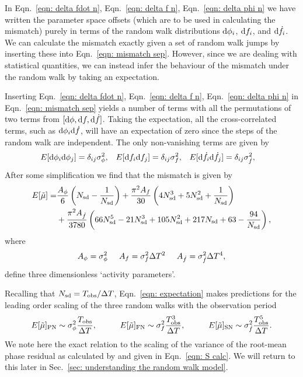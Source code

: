 \documentclass[../full_thesis/full_thesis.tex]{subfiles}
\begin{document}
In Eqn.~\eqref{eqn: delta fdot n}, Eqn.~\eqref{eqn: delta f n},
Eqn.~\eqref{eqn: delta phi n} we have written the parameter space offsets
(which are to be used in calculating the mismatch) purely in terms of the
random walk distributions $\mathrm{d} \phi_i$, $\mathrm{d} f_i$, and $\mathrm{d} \dot{f}_i$. We can
calculate the mismatch exactly given a set of random walk jumps by inserting
these into Eqn.~\eqref{eqn: mismatch sep}. However, since we are dealing with
statistical quantities, we can instead infer the behaviour of the mismatch
under the random walk by taking an expectation.

Inserting Eqn.~\eqref{eqn: delta fdot n}, Eqn.~\eqref{eqn: delta f n},
Eqn.~\eqref{eqn: delta phi n}  in Eqn.~\eqref{eqn: mismatch sep} yields a
number of terms with all the permutations of two terms from $[\mathrm{d} \phi, \mathrm{d} f,
\mathrm{d} \dot{f}]$. Taking the expectation, all the cross-correlated terms, such as
$\mathrm{d}\phi_{i}\mathrm{d} \dot{f}$, will have an expectation of zero since the steps of the
random walk are independent. The only non-vanishing terms are given by
\begin{align}
E[\mathrm{d}\phi_{i}\mathrm{d}\phi_{j}] &= \delta_{ij}\sigma_{\phi}^{2}, &
E[\mathrm{d}f_{i}\mathrm{d}f_{j}] &= \delta_{ij}\sigma_{f}^{2},&
E[\mathrm{d}\dot{f}_{i}\mathrm{d}\dot{f}_{j}] &= \delta_{ij}\sigma_{\dot{f}}^{2},
\end{align}
After some simplification we find that the mismatch is given by
\begin{align}
\begin{split}
E[\tilde{\mu}]   = &  \frac{A_{\phi}}{6} \left(N_{\textrm{sd}} - \frac{1}{N_{\textrm{sd}}}\right)
+ \frac{\pi^{2} A_{{f}}}{30}\left(4 N_{\textrm{sd}}^{3} + 5 N_{\textrm{sd}}^{2} + \frac{1}{N_{\textrm{sd}}}\right)\\
 & +  \frac{\pi^{2} A_{{\dot{f}}}}{3780} \left(66 N_{\textrm{sd}}^{5} - 21 N_{\textrm{sd}}^{3} + 105 N_{\textrm{sd}}^{2}
 + 217 N_{\textrm{sd}} + 63 - \frac{94}{N_{\textrm{sd}}}\right),
\end{split}
\label{eqn: expectation}
\end{align}
where
\begin{equation}
	A_{\phi} = \sigma_{\phi}^{2} \;\;\;\;\;
    A_{f} = \sigma_{f}^{2}\Delta T^{2} \;\;\;\;\;
    A_{\dot{f}} = \sigma_{\dot{f}}^{2}\Delta T^{4},
\end{equation}
define three dimensionless `activity parameters'.

Recalling that $N_{\textrm{sd}}=T_{\mathrm{obs}}/\Delta T$, Eqn.~\eqref{eqn: expectation} makes
predictions for the leading order
scaling of the three random walks with the observation period
\begin{equation}
E[\mutilde]_{\mathrm{PN}} \sim \sigP \frac{\Tobs}{\Delta T}, \hspace{10mm}
E[\mutilde]_{\mathrm{FN}} \sim \sigF \frac{\Tobs^{3}}{\Delta T}, \hspace{10mm}
E[\mutilde]_{\mathrm{SN}} \sim \sigS \frac{\Tobs^{5}}{\Delta T}.
\label{eqn: scalings}
\end{equation}
We note here the exact relation to the scaling of the variance of the
root-mean phase residual as calculated by \citet{Cordes1980} and given in
Eqn.~\eqref{eqn: S calc}. We will return to this later in Sec.~\ref{sec: understanding the random walk model}.
\end{document}
